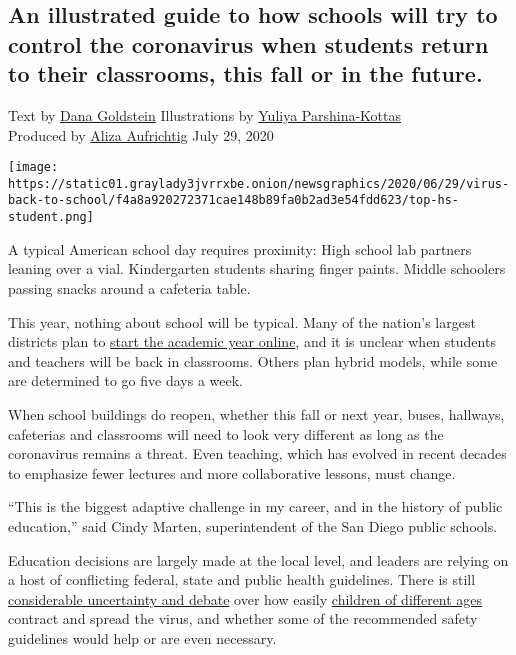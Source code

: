 \hypertarget{an-illustrated-guide-to-how-schools-will-try-to-control-the-coronavirus-when-students-return-to-their-classrooms-this-fall-or-in-the-future}{%
\subsection{An illustrated guide to how schools will try to control the
coronavirus when students return to their classrooms, this fall or in
the
future.}\label{an-illustrated-guide-to-how-schools-will-try-to-control-the-coronavirus-when-students-return-to-their-classrooms-this-fall-or-in-the-future}}

Text by \href{https://www.nytimes3xbfgragh.onion/by/dana-goldstein}{Dana
Goldstein} Illustrations by
\href{https://www.nytimes3xbfgragh.onion/by/yuliya-parshina-kottas}{Yuliya
Parshina-Kottas}\\
Produced by
\href{https://www.nytimes3xbfgragh.onion/by/aliza-aufrichtig}{Aliza
Aufrichtig} July 29, 2020

\texttt{[image: https://static01.graylady3jvrrxbe.onion/newsgraphics/2020/06/29/virus-back-to-school/f4a8a920272371cae148b89fa0b2ad3e54fdd623/top-hs-student.png]}

A typical American school day requires proximity: High school lab
partners leaning over a vial. Kindergarten students sharing finger
paints. Middle schoolers passing snacks around a cafeteria table.

This year, nothing about school will be typical. Many of the nation's
largest districts plan to
\href{https://www.nytimes3xbfgragh.onion/2020/07/14/us/coronavirus-schools-fall.html}{start
the academic year online}, and it is unclear when students and teachers
will be back in classrooms. Others plan hybrid models, while some are
determined to go five days a week.

When school buildings do reopen, whether this fall or next year, buses,
hallways, cafeterias and classrooms will need to look very different as
long as the coronavirus remains a threat. Even teaching, which has
evolved in recent decades to emphasize fewer lectures and more
collaborative lessons, must change.

``This is the biggest adaptive challenge in my career, and in the
history of public education,'' said Cindy Marten, superintendent of the
San Diego public schools.

Education decisions are largely made at the local level, and leaders are
relying on a host of conflicting federal, state and public health
guidelines. There is still
\href{https://www.nytimes3xbfgragh.onion/2020/07/11/health/coronavirus-schools-reopen.html}{considerable
uncertainty and debate} over how easily
\href{https://www.nytimes3xbfgragh.onion/2020/07/18/health/coronavirus-children-schools.html}{children
of different ages} contract and spread the virus, and whether some of
the recommended safety guidelines would help or are even necessary.

